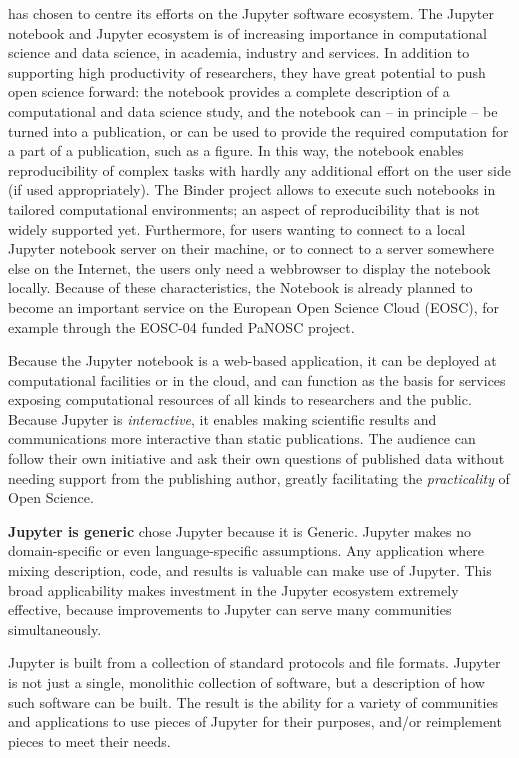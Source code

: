 \TheProject has chosen to centre its efforts on the Jupyter software ecosystem.
The Jupyter notebook and Jupyter ecosystem is of increasing
importance in computational science and data science, in academia,
industry and services. In addition to supporting high productivity
of researchers, they have great potential to push open science
forward: the notebook provides a complete description of a
computational and data science study, and the notebook can -- in
principle -- be turned into a publication, or can be used to provide
the required computation for a part of a publication, such as a
figure. In this way, the notebook enables reproducibility of complex
tasks with hardly any additional effort on the user side (if used
appropriately). The Binder project allows to execute such notebooks
in tailored computational environments; an aspect of reproducibility
that is not widely supported yet. Furthermore, for users wanting to
connect to a local Jupyter notebook server on their machine, or to
connect to a server somewhere else on the Internet, the users only
need a webbrowser to display the notebook locally. Because of these
characteristics, the Notebook is already planned to become an
important service on the European Open Science Cloud (EOSC), for
example through the EOSC-04 funded PaNOSC project.


Because the Jupyter notebook is a web-based application,
it can be deployed at computational facilities or in the cloud,
and can function as the basis for services
exposing computational resources of all kinds to researchers and the public.
Because Jupyter is \textit{interactive},
it enables making scientific results and communications more interactive
than static publications.
The audience can follow their own initiative and ask their own questions of published data
without needing support from the publishing author,
greatly facilitating the \textit{practicality} of Open Science.

\textbf{Jupyter is generic}
\TheProject chose Jupyter because it is Generic.
Jupyter makes no domain-specific or even language-specific assumptions.
Any application where mixing description, code, and results is valuable
can make use of Jupyter.
This broad applicability makes investment in the Jupyter ecosystem extremely effective,
because improvements to Jupyter can serve many communities simultaneously.

Jupyter is built from a collection of standard protocols and file formats.
Jupyter is not just a single, monolithic collection of software,
but a description of how such software can be built.
The result is the ability for a variety of communities and applications
to use pieces of Jupyter for their purposes,
and/or reimplement pieces to meet their needs.

